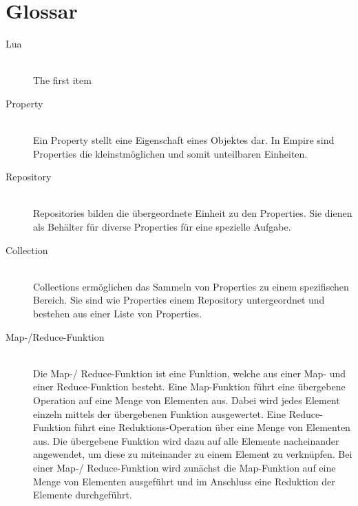
\section{Glossar}

\begin{description}
  \item[Lua] \hfill \\
  The first item
  \item[Property] \hfill \\
  Ein Property stellt eine Eigenschaft eines Objektes dar. In Empire sind Properties die kleinstmöglichen und somit unteilbaren Einheiten.
  \item[Repository] \hfill \\
  Repositories bilden die übergeordnete Einheit zu den Properties. Sie dienen als Behälter für diverse Properties für eine spezielle Aufgabe.
  \item[Collection] \hfill \\
  Collections ermöglichen das Sammeln von Properties zu einem spezifischen Bereich. Sie sind wie Properties einem Repository untergeordnet und bestehen aus einer Liste von Properties.
  \item[Map-/Reduce-Funktion] \hfill \\
  Die Map-/ Reduce-Funktion ist eine Funktion, welche aus einer Map- und einer Reduce-Funktion besteht. Eine Map-Funktion führt eine übergebene Operation auf eine Menge von Elementen aus. Dabei wird jedes Element einzeln mittels der übergebenen Funktion ausgewertet. Eine Reduce-Funktion führt eine Reduktions-Operation über eine Menge von Elementen aus. Die übergebene Funktion wird dazu auf alle Elemente nacheinander angewendet, um diese zu miteinander zu einem Element zu verknüpfen. Bei einer Map-/ Reduce-Funktion wird zunächst die Map-Funktion auf eine Menge von Elementen ausgeführt und im Anschluss eine Reduktion der Elemente durchgeführt.
\end{description}
